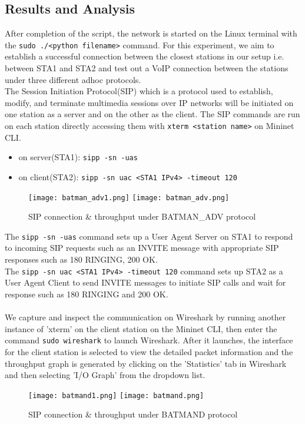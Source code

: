 \documentclass{article}
\begin{document}
\subsection{Results and Analysis}
After completion of the script, the network is started on the Linux terminal with the \texttt{sudo ./<python filename>} command. For this experiment, we aim to establish a successful connection between the closest stations in our setup i.e. between STA1 and STA2 and test out a VoIP connection between the stations under three different adhoc protocols. \\ The Session Initiation Protocol(SIP) which is a protocol used to establish, modify, and terminate multimedia sessions over IP networks will be initiated on one station as a server and on the other as the client. The SIP commands are run on each station directly accessing them with \texttt{xterm <station name>} on Mininet CLI.  
	\begin{itemize}
		\item on server(STA1): \texttt{sipp -sn -uas}
		\item on client(STA2): \texttt{sipp -sn uac <STA1 IPv4> -timeout 120}
	\end{itemize}
	\begin{figure}[h]
        		\centering
        		\texttt{[image: batman\_adv1.png]}
        		\texttt{[image: batman\_adv.png]}		
        		\caption{SIP connection \& throughput under BATMAN\_ADV protocol}
        		\label{fig:t2-2}
    	\end{figure}
The \texttt{sipp -sn -uas} command sets up a User Agent Server on STA1 to respond to incoming SIP requests such as an INVITE message with appropriate SIP responses such as 180 RINGING, 200 OK. \\ The \texttt{sipp -sn uac <STA1 IPv4> -timeout 120} command sets up STA2 as a User Agent Client to send INVITE messages to initiate SIP calls and wait for response such as 180 RINGING and 200 OK. \\\\ We capture and inspect the communication on Wireshark by running another instance of 'xterm' on the client station on the Mininet CLI, then enter the command \texttt{sudo wireshark} to launch Wireshark. After it launches, the interface for the client station is selected to view the detailed packet information and the throughput graph is generated by clicking on the 'Statistics' tab in Wireshark and then selecting 'I/O Graph' from the dropdown list.
    	\begin{figure}[h]
        		\centering
        		\texttt{[image: batmand1.png]}
		\texttt{[image: batmand.png]}
        		\caption{SIP connection \& throughput under BATMAND protocol}
        		\label{fig:t2-3}
    	\end{figure}
\end{document}
